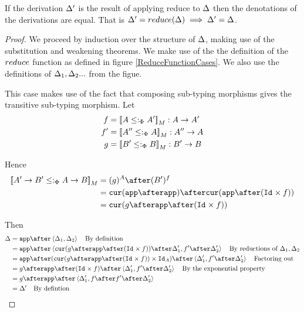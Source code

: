 \documentclass{Report}
\begin{document}
\begin{theorem}
   If the derivation $\Delta'$ is the result of applying  reduce to $\Delta$ then the denotations of the derivations are equal. That is $\Delta' = reduce(\Delta) \implies \Delta' = \Delta$.
\end{theorem}


\begin{proof}
    We proceed by induction over the structure of $\Delta$, making use of the substitution and weakening theorems. We make use of the the definition of the $reduce$ function as defined in figure \ref{ReduceFunctionCases}. We also use the definitions of $\Delta_1, \Delta_2 ...$ from the figue. 
    
    This case makes use of the fact that composing sub-typing morphisms gives the transitive sub-typing morphism.
        Let
        \begin{align}
            f & = {\bf [\![}A\leq:_\Phi A'{\bf ]\!]}_M: A\rightarrow A' \\
            f' & = {\bf [\![}A''\leq:_\Phi A{\bf ]\!]}_M: A'' \rightarrow A \\
            g & = {\bf [\![}B' \leq:_\Phi B{\bf ]\!]}_M: B' \rightarrow B \\
        \end{align}

        Hence 
        \begin{align}
            \deno{\fntype{A'}{B'}\subtypep \ab} & = (g)^A \after (B')^f \\
            & = \cur{\app\after \app}\after\cur{\app\after(\Id{}\times f)}\\
            & = \cur {g\after\app\after(\Id{}\times f)}
        \end{align}

        Then 
        \begin{align}
            \D & = \app\after\pr{\D_1}{\D_2}\qt{By definition}\\
            & = \app\after\pr{\cur {g\after\app\after(\Id{}\times f)}\after\D'_1}{f'\after\D'_2}\qt{By reductions of $\D_1, \D_2$}\\
            & = \app\after(\cur {g\after\app\after(\Id{}\times f)}\times\Id{A})\after\pr{\D'_1}{f'\after\D'_2} \qt{Factoring out}\\
            & = g\after\app\after(\Id{}\times f)\after\pr{\D'_1}{f'\after\D'_2}\qt{By the exponential property}\\
            & = g\after\app\after\pr{\D'_1}{f\after f'\after \D'_2}\\
            & = \D'\qt{By defintion}
        \end{align}
        

\end{proof}
\end{document}
